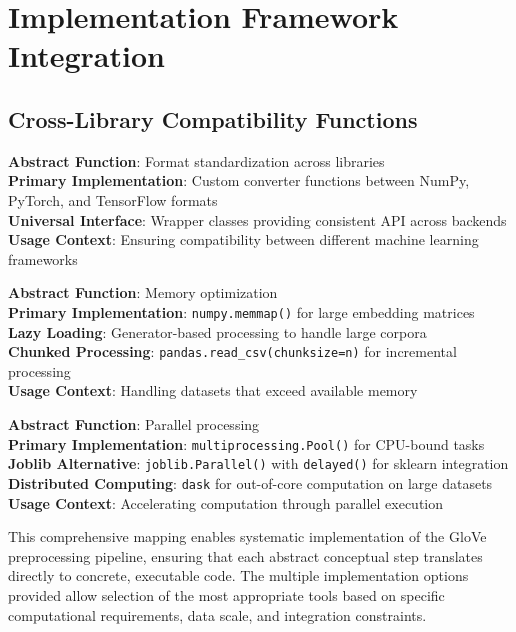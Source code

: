 \documentclass[11pt,a4paper]{article}
\begin{document}
\section{Implementation Framework Integration}

\subsection{Cross-Library Compatibility Functions}

\textbf{Abstract Function}: Format standardization across libraries \\
\textbf{Primary Implementation}: Custom converter functions between NumPy, PyTorch, and TensorFlow formats \\
\textbf{Universal Interface}: Wrapper classes providing consistent API across backends \\
\textbf{Usage Context}: Ensuring compatibility between different machine learning frameworks

\textbf{Abstract Function}: Memory optimization \\
\textbf{Primary Implementation}: \texttt{numpy.memmap()} for large embedding matrices \\
\textbf{Lazy Loading}: Generator-based processing to handle large corpora \\
\textbf{Chunked Processing}: \texttt{pandas.read\_csv(chunksize=n)} for incremental processing \\
\textbf{Usage Context}: Handling datasets that exceed available memory

\textbf{Abstract Function}: Parallel processing \\
\textbf{Primary Implementation}: \texttt{multiprocessing.Pool()} for CPU-bound tasks \\
\textbf{Joblib Alternative}: \texttt{joblib.Parallel()} with \texttt{delayed()} for sklearn integration \\
\textbf{Distributed Computing}: \texttt{dask} for out-of-core computation on large datasets \\
\textbf{Usage Context}: Accelerating computation through parallel execution

This comprehensive mapping enables systematic implementation of the GloVe preprocessing pipeline, ensuring that each abstract conceptual step translates directly to concrete, executable code. The multiple implementation options provided allow selection of the most appropriate tools based on specific computational requirements, data scale, and integration constraints.
\end{document}

